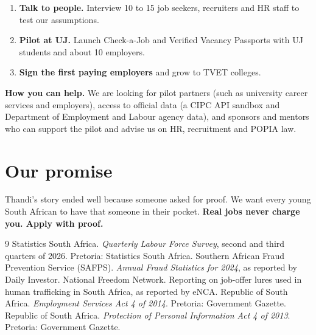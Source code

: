 \documentclass[11pt,a4paper]{article}
\begin{document}
\begin{enumerate}
  \item \textbf{Talk to people.} Interview 10 to 15 job seekers, recruiters and HR staff to test our assumptions.
  \item \textbf{Pilot at UJ.} Launch Check-a-Job and Verified Vacancy Passports with UJ students and about 10 employers.
  \item \textbf{Sign the first paying employers} and grow to TVET colleges.
\end{enumerate}

\textbf{How you can help.} We are looking for pilot partners (such as university career services and employers), access to official data (a CIPC API sandbox and Department of Employment and Labour agency data), and sponsors and mentors who can support the pilot and advise us on HR, recruitment and POPIA law.

\section{Our promise}
Thandi's story ended well because someone asked for proof. We want every young South African to have that someone in their pocket. \textbf{Real jobs never charge you. Apply with proof.}

\clearpage
{}
\begin{thebibliography}{9}
\setlength{\itemsep}{6pt}
 Statistics South Africa. \emph{Quarterly Labour Force Survey}, second and third quarters of 2026. Pretoria: Statistics South Africa.
 Southern African Fraud Prevention Service (SAFPS). \emph{Annual Fraud Statistics for 2024}, as reported by Daily Investor.
 National Freedom Network. Reporting on job-offer lures used in human trafficking in South Africa, as reported by eNCA.
 Republic of South Africa. \emph{Employment Services Act 4 of 2014}. Pretoria: Government Gazette.
 Republic of South Africa. \emph{Protection of Personal Information Act 4 of 2013}. Pretoria: Government Gazette.
\end{thebibliography}
\end{document}
